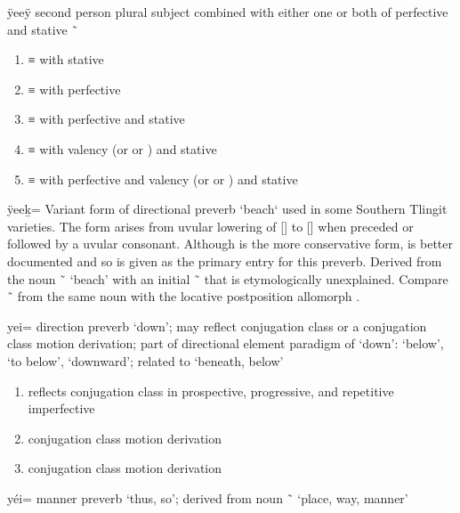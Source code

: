 \begin{morphdesc}[resume*=alphalist]
\item[ÿeeÿ]
	second person plural subject  combined with either one or both of
		perfective 
		and stative  \~\ 
	\begin{enumerate}
	\item	{} ≡ 
		with stative 
	\item	{} ≡ 
		with perfective 
	\item	{} ≡ 
		with perfective 
		and stative 
	\item	{} ≡ 
		with valency 
			(or   or  )
		and stative 
	\item	{} ≡ 
		with perfective 
		and valency 
			(or   or  )
		and stative 
	\end{enumerate}

\item[ÿeeḵ=]\label{m:ÿeeḵ=}
	Variant form of directional preverb  ‘beach‘ used in some Southern Tlingit varieties.
	The  form arises from uvular lowering of  [] to  []
		when preceded or followed by a uvular consonant.
	Although  is the more conservative form,  is better documented and
		so is given as the primary entry for this preverb.
	Derived from the noun  \~\  ‘beach’
		with an initial  \~\  that is etymologically unexplained.
	Compare  \~\  from the same noun with the locative postposition
		allomorph .
	
\item[yei=]\label{m:yei=}
	direction preverb ‘down’;
	may reflect  conjugation class or a  conjugation class motion derivation;
	part of directional element paradigm of  ‘down’:
		 ‘below’,  ‘to below’,  ‘downward’;
	related to  ‘beneath, below’
	\begin{enumerate}
	\item	reflects  conjugation class in prospective, progressive, and repetitive imperfective
	\item	{} conjugation class motion derivation
	\item	{} conjugation class motion derivation
	\end{enumerate}

\item[yéi=]\label{m:yéi=}
	manner preverb ‘thus, so’;
	derived from noun  \~\  ‘place, way, manner’


\end{morphdesc}
